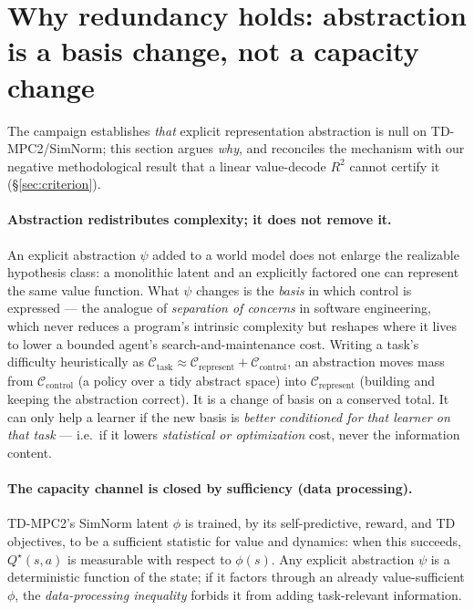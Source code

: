 
\section{Why redundancy holds: abstraction is a basis change, not a capacity change}
\label{sec:mechanism}

The campaign establishes \emph{that} explicit representation abstraction is null on
TD-MPC2/SimNorm; this section argues \emph{why}, and reconciles the mechanism with our
negative methodological result that a linear value-decode $R^2$ cannot certify it
(\S\ref{sec:criterion}).

\paragraph{Abstraction redistributes complexity; it does not remove it.}
An explicit abstraction $\psi$ added to a world model does not enlarge the realizable
hypothesis class: a monolithic latent and an explicitly factored one can represent the same
value function. What $\psi$ changes is the \emph{basis} in which control is expressed --- the
analogue of \emph{separation of concerns} in software engineering, which never reduces a
program's intrinsic complexity but reshapes where it lives to lower a bounded agent's
search-and-maintenance cost. Writing a task's difficulty heuristically as
$\mathcal{C}_{\text{task}} \approx \mathcal{C}_{\text{represent}} + \mathcal{C}_{\text{control}}$,
an abstraction moves mass from $\mathcal{C}_{\text{control}}$ (a policy over a tidy abstract
space) into $\mathcal{C}_{\text{represent}}$ (building and keeping the abstraction correct).
It is a change of basis on a conserved total. It can only help a learner if the new basis is
\emph{better conditioned for that learner on that task} --- i.e.\ if it lowers \emph{statistical
or optimization} cost, never the information content.

\paragraph{The capacity channel is closed by sufficiency (data processing).}
TD-MPC2's SimNorm latent $\phi$ is trained, by its self-predictive, reward, and TD objectives,
to be a sufficient statistic for value and dynamics: when this succeeds, $Q^\star(s,a)$ is
measurable with respect to $\phi(s)$. Any explicit abstraction $\psi$ is a deterministic
function of the state; if it factors through an already value-sufficient $\phi$, the
\emph{data-processing inequality} forbids it from adding task-relevant information.

